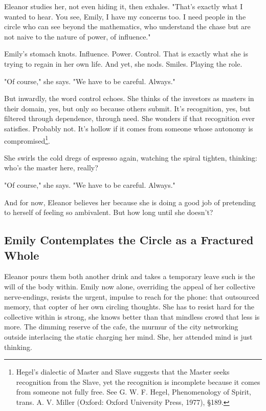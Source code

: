 \smallskip

Eleanor studies her, not even hiding it, then exhales. "That’s exactly what I wanted to hear. You see, Emily, I have my concerns too. I need people in the circle who can see beyond the mathematics, who understand the chase but are not naive to the nature of power, of influence."

\smallskip

Emily’s stomach knots. Influence. Power. Control. That is exactly what she is trying to regain in her own life. And yet, she nods. Smiles. Playing the role.

\smallskip

"Of course," she says. "We have to be careful. Always."

\smallskip

But inwardly, the word control echoes. She thinks of the investors as masters in their domain, yes, but only so because others submit. It’s recognition, yes, but filtered through dependence, through need. She wonders if that recognition ever satisfies. Probably not. It’s hollow if it comes from someone whose autonomy is compromised\footnote{Hegel’s dialectic of Master and Slave suggests that the Master seeks recognition from the Slave, yet the recognition is incomplete because it comes from someone not fully free. See G. W. F. Hegel, Phenomenology of Spirit, trans. A. V. Miller (Oxford: Oxford University Press, 1977), §189.}.

\smallskip

She swirls the cold dregs of espresso again, watching the spiral tighten, thinking: who’s the master here, really? 

"Of course," she says. "We have to be careful. Always."

And for now, Eleanor believes her because she is doing a good job of pretending to herself of feeling so ambivalent. But how long until she doesn’t?

\subsection*{Emily Contemplates the Circle as a Fractured Whole}

Eleanor pours them both another drink and takes a temporary leave such is the will of the body within. Emily now alone, overriding the appeal of her collective nerve-endings, resists the urgent, impulse to reach for the phone: 
that outsourced memory, that copter of her own circling thoughts. She has to resist hard for the collective within is strong, she knows better than that mindless crowd that less is more. The dimming reserve of the cafe, the murmur of the city networking outside interlacing the static charging her mind. She, her attended mind is just thinking.

